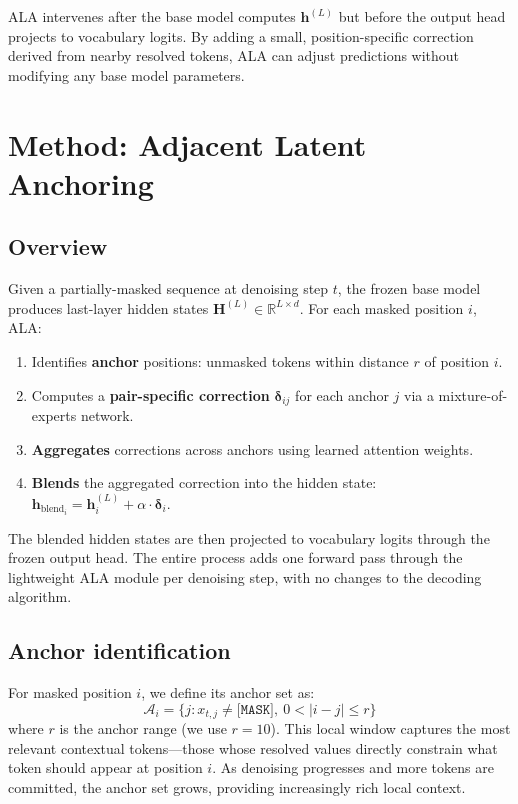 \documentclass{article} %
\newcommand{\hblend}{\mathbf{h}_{\text{blend}}}
\newcommand{\deltaH}{\boldsymbol{\delta}}
\begin{document}
ALA intervenes after the base model computes $\mathbf{h}^{(L)}$ but before the output head projects to vocabulary logits.
By adding a small, position-specific correction derived from nearby resolved tokens, ALA can adjust predictions without modifying any base model parameters.


\section{Method: Adjacent Latent Anchoring}
\label{sec:method}

\subsection{Overview}

Given a partially-masked sequence at denoising step $t$, the frozen base model produces last-layer hidden states $\mathbf{H}^{(L)} \in \mathbb{R}^{L \times d}$.
For each masked position $i$, ALA:
\begin{enumerate}
    \item Identifies \textbf{anchor} positions: unmasked tokens within distance $r$ of position $i$.
    \item Computes a \textbf{pair-specific correction} $\deltaH_{ij}$ for each anchor $j$ via a mixture-of-experts network.
    \item \textbf{Aggregates} corrections across anchors using learned attention weights.
    \item \textbf{Blends} the aggregated correction into the hidden state: $\hblend_i = \mathbf{h}_i^{(L)} + \alpha \cdot \deltaH_i$.
\end{enumerate}
The blended hidden states are then projected to vocabulary logits through the frozen output head.
The entire process adds one forward pass through the lightweight ALA module per denoising step, with no changes to the decoding algorithm.

\subsection{Anchor identification}

For masked position $i$, we define its anchor set as:
\begin{equation}
    \mathcal{A}_i = \{j : x_{t,j} \neq \texttt{[MASK]},\ 0 < |i - j| \leq r\}
\end{equation}
where $r$ is the anchor range (we use $r{=}10$).
This local window captures the most relevant contextual tokens---those whose resolved values directly constrain what token should appear at position $i$.
As denoising progresses and more tokens are committed, the anchor set grows, providing increasingly rich local context.
\end{document}
